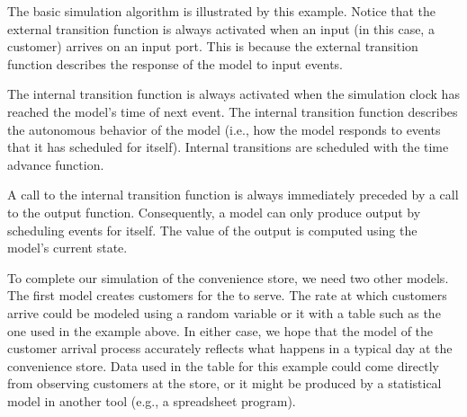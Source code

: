 The basic simulation algorithm is illustrated by this example. Notice that the external transition function is always activated when an input (in this case, a customer) arrives on an input port. This is because the external transition function describes the response of the model to input events.

The internal transition function is always activated when the simulation clock has reached the model's time of next event. The internal transition function describes the autonomous behavior of the model (i.e., how the model responds to events that it has scheduled for itself). Internal transitions are scheduled with the time advance function.

A call to the internal transition function is always immediately preceded by a call to the output function. Consequently, a model can only produce output by scheduling events for itself. The value of the output is computed using the model's current state.

To complete our simulation of the convenience store, we need two other  models. The first model creates customers for the  to serve. The rate at which customers arrive could be modeled using a random variable or it with a table such as the one used in the example above. In either case, we hope that the model of the customer arrival process accurately reflects what happens in a typical day at the convenience store. Data used in the table for this example could come directly from observing customers at the store, or it might be produced by a statistical model in another tool (e.g., a spreadsheet program).

